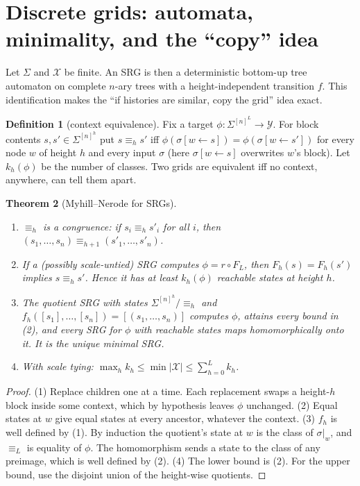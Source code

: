 \documentclass[11pt]{article}
\newtheorem{theorem}{Theorem}[section]
\theoremstyle{definition}
\newtheorem{definition}[theorem]{Definition}
\newcommand{\cX}{\mathcal{X}}
\begin{document}
\section{Discrete grids: automata, minimality, and the ``copy'' idea}\label{sec:discrete}
Let $\Sigma$ and $\cX$ be finite. An SRG is then a deterministic bottom-up tree automaton on
complete $n$-ary trees with a height-independent transition $f$. This identification makes the
``if histories are similar, copy the grid'' idea exact.

\begin{definition}[context equivalence]
Fix a target $\phi:\Sigma^{[n]^L}\to\mathcal Y$. For block contents $s,s'\in\Sigma^{[n]^h}$ put
$s\equiv_h s'$ iff $\phi(\sigma[w\!\leftarrow\! s])=\phi(\sigma[w\!\leftarrow\! s'])$ for every
node $w$ of height $h$ and every input $\sigma$ (here $\sigma[w\leftarrow s]$ overwrites $w$'s
block). Let $k_h(\phi)$ be the number of classes.
Two grids are equivalent iff no context, anywhere, can tell them apart.
\end{definition}

\begin{theorem}[Myhill--Nerode for SRGs]\label{thm:mn}
\begin{enumerate}
\item $\equiv_h$ is a congruence: if $s_i\equiv_h s'_i$ for all $i$, then
$(s_1,\dots,s_n)\equiv_{h+1}(s'_1,\dots,s'_n)$.
\item If a (possibly scale-untied) SRG computes $\phi=r\circ F_L$, then $F_h(s)=F_h(s')$
implies $s\equiv_h s'$. Hence it has at least $k_h(\phi)$ reachable states at height $h$.
\item The quotient SRG with states $\Sigma^{[n]^h}/\!\equiv_h$ and
$f_h([s_1],\dots,[s_n])=[(s_1,\dots,s_n)]$ computes $\phi$, attains every bound in (2), and
every SRG for $\phi$ with reachable states maps homomorphically onto it. It is the unique
minimal SRG.
\item With scale tying: $\max_h k_h\le\min|\cX|\le\sum_{h=0}^{L}k_h$.
\end{enumerate}
\end{theorem}
\begin{proof}
(1) Replace children one at a time. Each replacement swaps a height-$h$ block inside some
context, which by hypothesis leaves $\phi$ unchanged.
(2) Equal states at $w$ give equal states at every ancestor, whatever the context.
(3) $f_h$ is well defined by (1). By induction the quotient's state at $w$ is the class of
$\sigma|_w$, and $\equiv_L$ is equality of $\phi$. The homomorphism sends a state to the class of
any preimage, which is well defined by (2).
(4) The lower bound is (2). For the upper bound, use the disjoint union of the height-wise
quotients.
\end{proof}
\end{document}
